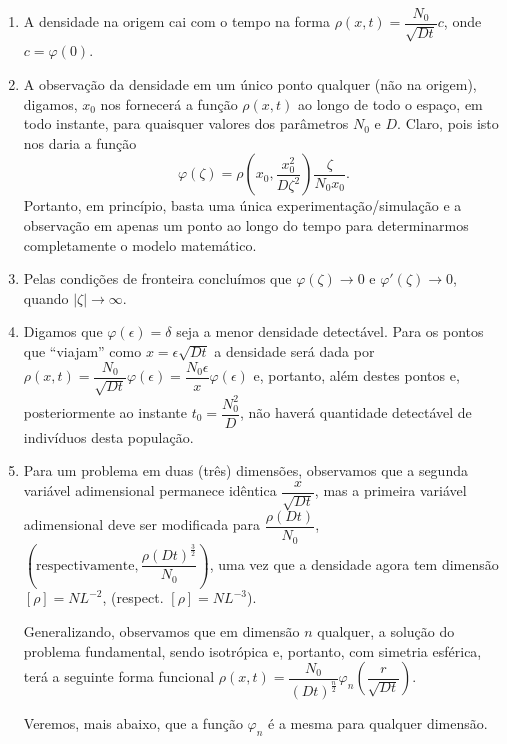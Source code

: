 \begin{enumerate}
    \item A densidade na origem cai com o tempo na forma \(\rho(x, t) = \dfrac{N_{0}}{\sqrt{Dt}} c\), onde \(c = \varphi(0)\).

    \item A observação da densidade em um único ponto qualquer (não na origem), digamos, \(x_0\) nos fornecerá a função \(\rho(x, t)\) ao longo de todo o espaço, em todo instante, para quaisquer valores dos parâmetros \(N_{0}\) e \(D\). Claro, pois isto nos daria a função
    \[\varphi(\zeta) = \rho\left(x_0, \dfrac{x_0^2}{D\zeta^{2}}\right) \dfrac{\zeta}{N_{0}x_0}.\] Portanto, em princípio, basta uma única experimentação/simulação e a observação em apenas um ponto ao longo do tempo para determinarmos completamente o modelo matemático.

    \item Pelas condições de fronteira concluímos que \(\varphi(\zeta) \to 0\) e \(\varphi'(\zeta) \to 0\), quando \(|\zeta| \to \infty\).

    \item Digamos que \(\varphi(\epsilon) = \delta\) seja a menor densidade detectável. Para os pontos que ``viajam'' como \(x = \epsilon \sqrt{Dt}\) a densidade será dada por \(\rho(x, t) = \dfrac{N_{0}}{\sqrt{Dt}} \varphi(\epsilon) = \dfrac{N_{0} \epsilon}{x} \varphi(\epsilon)\) e, portanto, além destes pontos e, posteriormente ao instante \(t_0 = \dfrac{N_{0}^{2}}{D}\), não haverá quantidade detectável de indivíduos desta população.

    \item Para um problema em duas (três) dimensões, observamos que a segunda variável adimensional permanece idêntica \(\dfrac{x}{\sqrt{Dt}}\), mas a primeira variável adimensional deve ser modificada para \(\dfrac{\rho(Dt)}{N_{0}}\), \(\left(\mbox{respectivamente}, \dfrac{\rho(Dt)^{\frac{3}{2}}}{N_{0}}\right)\), uma vez que a densidade agora tem dimensão \([\rho] = NL^{-2}\), (respect. \([\rho] = NL^{-3}\)).

    Generalizando, observamos que em dimensão \(n\) qualquer, a solução do problema fundamental, sendo isotrópica e, portanto, com simetria esférica, terá a seguinte forma funcional \(\rho(x, t) = \dfrac{N_{0}}{(Dt)^{\frac{n}{2}}} \varphi_{n}\left(\dfrac{r}{\sqrt{Dt}}\right)\).

    Veremos, mais abaixo, que a função \(\varphi_{n}\) é a mesma para qualquer dimensão.


\end{enumerate}
